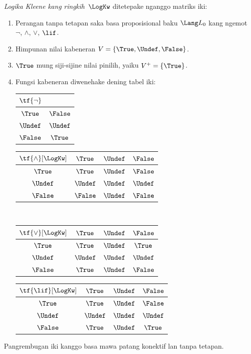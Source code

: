 \documentclass[../../../include/open-logic-section]{subfiles}
\begin{document}
\begin{defn}
\emph{Logika Kleene kang ringkih}~$\LogKw$ ditetepake nganggo matriks iki:
\begin{enumerate}
  \item Perangan tanpa tetapan saka basa proposisional baku
  $\Lang L_0$ kang ngemot $\lnot$, $\land$, $\lor$, $\lif$.
  \item Himpunan nilai kabeneran $V = \{\True, \Undef, \False\}$.
  \item $\True$ mung siji-sijine nilai pinilih, yaiku $V^+ = \{\True\}$.
  \item Fungsi kabeneran diwenehake dening tabel iki:
  \begin{center}
    \begin{tabular}{c|c} 
      $\tf{\lnot}$ & \\ 
      \hline  
      $\True$ & $\False$ \\ 
      $\Undef$ & $\Undef$ \\
      $\False$ & $\True$ 
    \end{tabular}
    \quad
    \begin{tabular}{c|ccc} 
      $\tf{\land}[\LogKw]$ & $\True$ & $\Undef$ & $\False$ \\ 
      \hline 
      $\True$ & $\True$ & $\Undef$ & $\False$ \\ 
      $\Undef$ & $\Undef$ & $\Undef$ & $\Undef$\\ 
      $\False$ & $\False$ & $\Undef$ & $\False$ 
    \end{tabular}
    \\[2ex]
    \begin{tabular}{c|ccc} 
      $\tf{\lor}[\LogKw]$ & $\True$ & $\Undef$ & $\False$ \\ 
      \hline 
      $\True$ & $\True$ & $\Undef$ & $\True$ \\ 
      $\Undef$ & $\Undef$ & $\Undef$ & $\Undef$ \\
      $\False$ & $\True$ & $\Undef$ & $\False$ 
    \end{tabular}
    \quad
    \begin{tabular}{c|ccc} 
      $\tf{\lif}[\LogKw]$ & $\True$ & $\Undef$ & $\False$ \\ 
      \hline 
      $\True$ & $\True$ & $\Undef$ & $\False$ \\ 
      $\Undef$ & $\Undef$ & $\Undef$ & $\Undef$  \\ 
      $\False$ & $\True$ & $\Undef$ & $\True$ 
    \end{tabular}
  \end{center} 
\end{enumerate}
Pangrembugan iki kanggo basa mawa patang konektif lan tanpa tetapan.
\end{defn}
\end{document}
